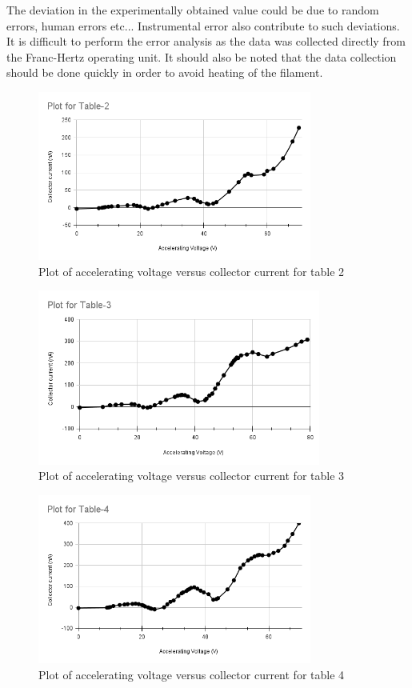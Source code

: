 \documentclass[a4paper, amsfonts, amssymb, amsmath, reprint, showkeys, nofootinbib, twoside]{revtex4-1}
\begin{document}
The deviation in the experimentally obtained value could be due to random errors, human errors etc... Instrumental error also contribute to such deviations. It is difficult to perform the error analysis as the data was collected directly from the Franc-Hertz operating unit. It should also be noted that the data collection should be done quickly in order to avoid heating of the filament.

\begin{figure}[H] %
   \centering
   \includegraphics[width=9cm]{t2} 
   \caption{Plot of accelerating voltage versus collector current for table 2}
   \label{t2}
\end{figure}

\begin{figure}[H] %
   \centering
   \includegraphics[width=9.3cm]{t3} 
   \caption{Plot of accelerating voltage versus collector current for table 3}
   \label{t3}
\end{figure}

\begin{figure}[H] %
   \centering
   \includegraphics[width=9cm]{t4} 
   \caption{Plot of accelerating voltage versus collector current for table 4}
   \label{t4}
\end{figure}
\end{document}
